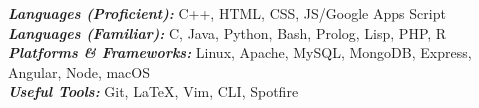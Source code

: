 

\begin{cvparagraph}
  \textbf{\textit{Languages (Proficient): }} C++, HTML, CSS, JS/Google Apps Script\\
  \textbf{\textit{Languages (Familiar): }}C, Java, Python, Bash, Prolog, Lisp, PHP, R \\
  \textbf{\textit{Platforms \& Frameworks: }}Linux, Apache, MySQL, MongoDB, Express, Angular, Node, macOS \\
  \textbf{\textit{Useful Tools: }}Git, \LaTeX, Vim, CLI, Spotfire
\end{cvparagraph}
